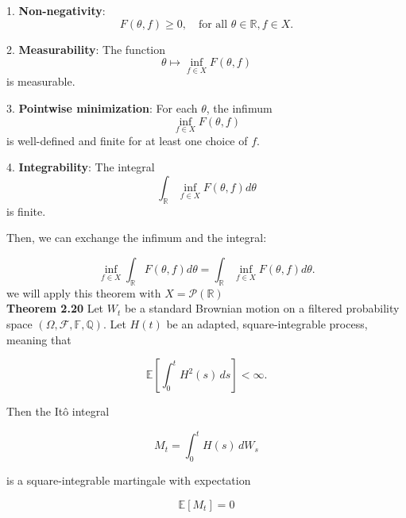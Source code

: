 \documentclass[oneside, a4paper, onecolumn, 11pt]{article}
\begin{document}
1. \textbf{Non-negativity}:  
   \[
   F(\theta, f) \geq 0, \quad \text{for all } \theta \in \mathbb{R}, f \in X.
   \]

2. \textbf{Measurability}:  
   The function  
   \[
   \theta \mapsto \inf_{f \in X} F(\theta, f)
   \]
   is measurable.

3. \textbf{Pointwise minimization}:  
   For each \( \theta \), the infimum  
   \[
   \inf_{f \in X} F(\theta, f)
   \]
   is well-defined and finite for at least one choice of \( f \).

4. \textbf{Integrability}:  
   The integral  
   \[
   \int_{\mathbb{R}} \inf_{f \in X} F(\theta, f) d\theta
   \]
   is finite.

Then, we can exchange the infimum and the integral:

\[
\inf_{f \in X} \int_{\mathbb{R}} F(\theta, f) d\theta = \int_{\mathbb{R}} \inf_{f \in X} F(\theta, f) d\theta.
\]
we will apply this theorem with $X= \mathcal{P}(\mathbb{R})$
\\\textbf{Theorem 2.20} \cite{Karatzas1991}
Let \( W_t \) be a standard Brownian motion on a filtered probability space \( (\Omega, \mathcal{F},  \mathbb{F}, \mathbb{Q}) \).  
Let \( H(t) \) be an adapted, square-integrable process, meaning that  

\[
\mathbb{E} \left[ \int_0^t H^2(s) \, ds \right] < \infty.
\]

Then the Itô integral  

\[
M_t = \int_0^t H(s) \, dW_s
\]

is a square-integrable martingale with expectation  

\[
\mathbb{E} [ M_t ] = 0
\]
\end{document}
